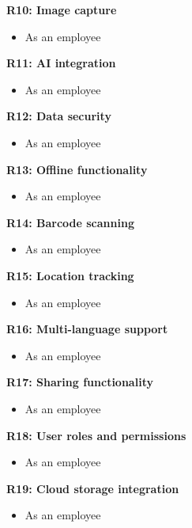 \documentclass[hidelinks, 12pt, a4paper]{article}
\begin{document}

    \item \textbf{R10: Image capture}
    \begin{itemize}
        \item As an employee
    \end{itemize}

    \item \textbf{R11: AI integration}
    \begin{itemize}
        \item As an employee
    \end{itemize}
    \item \textbf{R12: Data security}
    \begin{itemize}
        \item As an employee
    \end{itemize}

    \item \textbf{R13: Offline functionality}
    \begin{itemize}
        \item As an employee
    \end{itemize}

    \item \textbf{R14: Barcode scanning}
    \begin{itemize}
        \item As an employee
    \end{itemize}

    \item \textbf{R15: Location tracking}
    \begin{itemize}
        \item As an employee
    \end{itemize}

    \item \textbf{R16: Multi-language support}
    \begin{itemize}
        \item As an employee
    \end{itemize}

    \item \textbf{R17: Sharing functionality}
    \begin{itemize}
        \item As an employee
    \end{itemize}

    \item \textbf{R18: User roles and permissions}
    \begin{itemize}
        \item As an employee
    \end{itemize}

    \item \textbf{R19: Cloud storage integration}
    \begin{itemize}
        \item As an employee
    \end{itemize}
    \pagebreak
\end{document}
